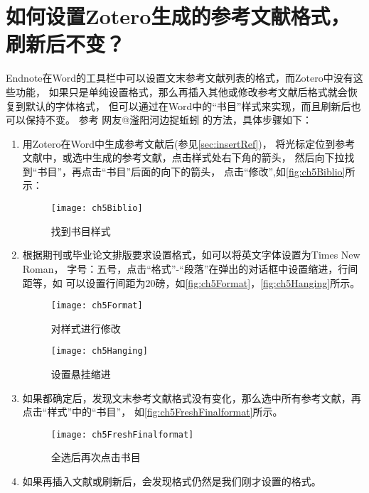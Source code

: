 \documentclass[cn,11pt,chinese]{elegantbook}
\begin{document}
		\section{如何设置Zotero生成的参考文献格式，刷新后不变？}\label{sec:refresh}
		Endnote在Word的工具栏中可以设置文末参考文献列表的格式，而Zotero中没有这些功能，
		如果只是单纯设置格式，那么再插入其他或修改参考文献后格式就会恢复到默认的字体格式，
		但可以通过在Word中的“书目”样式来实现，而且刷新后也可以保持不变。
		参考 网友@滏阳河边捉蚯蚓 的方法，具体步骤如下：
			\begin{enumerate}
				\item
				用Zotero在Word中生成参考文献后(参见\cref{sec:insertRef})，
				将光标定位到参考文献中，或选中生成的参考文献，点击样式处右下角的箭头，
				然后向下拉找到“书目”，再点击“书目”后面的向下的箭头，
				点击“修改”,如\autoref{fig:ch5Biblio}所示：
		    		\begin{figure}[htbp]
			    		\centering
			    		\texttt{[image: ch5Biblio]}
			    		\caption{找到书目样式}
			    		\label{fig:ch5Biblio}
		    	  \end{figure}
		    	\item
				根据期刊或毕业论文排版要求设置格式，如可以将英文字体设置为Times New Roman，
				字号：五号，点击“格式”-“段落”在弹出的对话框中设置缩进，行间距等，如
				可以设置行间距为20磅，如\autoref{fig:ch5Format}，\autoref{fig:ch5Hanging}所示。
			    	\begin{figure}[t]
			    		\centering
			    		\texttt{[image: ch5Format]}
			    		\caption{对样式进行修改}
			    		\label{fig:ch5Format}
			    	\end{figure}
		    	 
			    	\begin{figure}[htbp]
			    		\centering
			    		\texttt{[image: ch5Hanging]}
			    		\caption{设置悬挂缩进}
			    		\label{fig:ch5Hanging}
			    	\end{figure}
		    	\item
				 如果都确定后，发现文末参考文献格式没有变化，那么选中所有参考文献，再点击“样式”中的“书目”，
				 如\autoref{fig:ch5FreshFinalformat}所示。
			    	\begin{figure}[htbp]
			    		\centering
			    		\texttt{[image: ch5FreshFinalformat]}
			    		\caption{全选后再次点击书目}
			    		\label{fig:ch5FreshFinalformat}
			    	\end{figure}
		    	\item
		    	如果再插入文献或刷新后，会发现格式仍然是我们刚才设置的格式。
			\end{enumerate}
\end{document}
